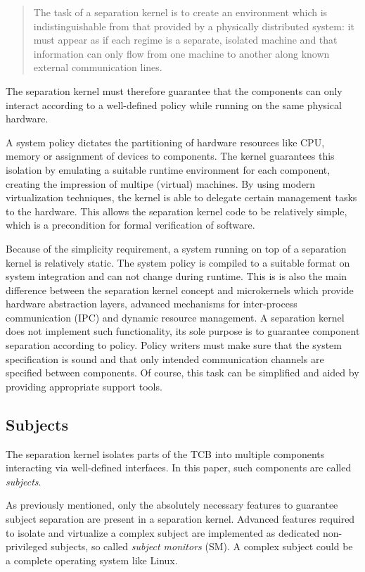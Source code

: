 \begin{quote}
The task of a separation kernel is to create an environment which is
indistinguishable from that provided by a physically distributed system: it
must appear as if each regime is a separate, isolated machine and that
information can only flow from one machine to another along known external
communication lines.
\end{quote}

The separation kernel must therefore guarantee that the components can only
interact according to a well-defined policy while running on the same physical
hardware.

A system policy dictates the partitioning of hardware resources like CPU,
memory or assignment of devices to components. The kernel guarantees this
isolation by emulating a suitable runtime environment for each component,
creating the impression of multipe (virtual) machines. By using modern
virtualization techniques, the kernel is able to delegate certain management
tasks to the hardware. This allows the separation kernel code to be relatively
simple, which is a precondition for formal verification of software.

Because of the simplicity requirement, a system running on top of a separation
kernel is relatively static. The system policy is compiled to a suitable format
on system integration and can not change during runtime. This is is also the
main difference between the separation kernel concept and microkernels which
provide hardware abstraction layers, advanced mechanisms for inter-process
communication (IPC) and dynamic resource management. A separation
kernel does not implement such functionality, its sole purpose is to guarantee
component separation according to policy. Policy writers must make sure that
the system specification is sound and that only intended communication channels
are specified between components.  Of course, this task can be simplified and
aided by providing appropriate support tools.

\subsection{Subjects}
The separation kernel isolates parts of the TCB into multiple
components interacting via well-defined interfaces. In this
paper, such components are called \emph{subjects}.

As previously mentioned, only the absolutely necessary features to guarantee
subject separation are present in a separation kernel. Advanced features
required to isolate and virtualize a complex subject are implemented as
dedicated non-privileged subjects, so called \emph{subject monitors}
(SM). A complex subject could be a complete operating system like
Linux.


